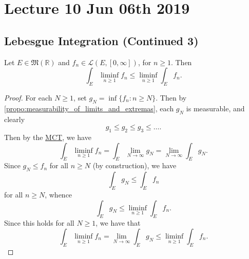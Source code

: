 \documentclass[notoc,notitlepage]{tufte-book}
\begin{document}


\chapter{Lecture 10 Jun 06th 2019}%
\label{chp:lecture_10_jun_06th_2019}

\section{Lebesgue Integration (Continued 3)}%
\label{sec:lebesgue_integration_continued_3}

\begin{thm}\label{thm:fatou_s_lemma}
  Let $E \in \mathfrak{M}(\mathbb{R})$ and $f_n \in \mathcal{L}(E, [0,
  \infty])$, for $n \geq 1$. Then
  \begin{equation*}
    \int_{E} \liminf_{n \geq 1} f_n \leq \liminf_{n \geq 1} \int_{E} f_n.
  \end{equation*}
\end{thm}

\begin{proof}
  For each $N \geq 1$, set $g_N = \inf \{ f_n : n \geq N \}$. Then by
  \cref{propo:measurability_of_limits_and_extremas}, each $g_N$ is measurable,
  and clearly
  \begin{equation*}
    g_1 \leq g_2 \leq g_3 \leq \hdots.
  \end{equation*}
  Then by the \hyperref[thm:the_monotone_convergence_theorem]{MCT}, we have
  \begin{equation*}
    \int_{E} \liminf_{n \geq 1} f_n = \int_{E} \lim_{N \to \infty} g_N = \lim_{N
    \to \infty} \int_{E} g_N.
  \end{equation*}
  Since $g_N \leq f_n$ for all $n \geq N$ (by construction), we have
  \begin{equation*}
    \int_{E} g_N \leq \int_{E} f_n
  \end{equation*}
  for all $n \geq N$, whence
  \begin{equation*}
    \int_{E} g_N \leq \liminf_{n \geq 1} \int_{E} f_n.
  \end{equation*}
  Since this holds for all $N \geq 1$, we have that
  \begin{equation*}
    \int_{E} \liminf_{n \geq 1} f_n = \lim_{N \to \infty} \int_{E} g_N \leq
    \liminf_{n \geq 1} \int_{E} f_n.
  \end{equation*}
\end{proof}
\end{document}
